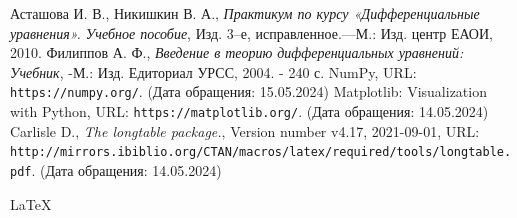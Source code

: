 \documentclass{article}
\begin{document}
\begin{thebibliography}{9} \large
{} Асташова И. В., Никишкин В. А., \textit{Практикум по курсу «Дифференциальные уравнения». Учебное пособие}, Изд. 3–е, исправленное.—М.: Изд. центр ЕАОИ, 2010.
 Филиппов А. Ф., \textit{Введение в теорию дифференциальных уравнений: Учебник}, -М.: Изд. Едиториал УРСС, 2004. - 240 с.
 NumPy, URL: \verb!https://numpy.org/!. (Дата обращения: 15.05.2024)
 Matplotlib: Visualization with Python, URL: \verb!https://matplotlib.org/!. (Дата обращения: 14.05.2024)
 Carlisle D., \textit{The longtable package.}, Version number v4.17, 2021-09-01, URL: \verb!http://mirrors.ibiblio.org/CTAN/macros/latex/required/tools/longtable.pdf!. (Дата обращения: 14.05.2024)
\end{thebibliography}
\begin{center}
\LaTeX
\end{center}
\end{document}
